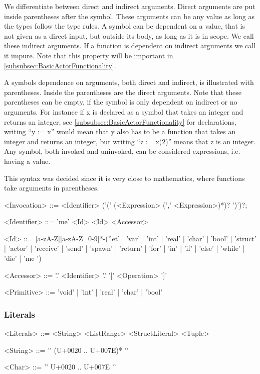 We differentiate between direct and indirect arguments. Direct arguments are put inside parentheses after the symbol. These arguments can be any value as long as the types follow the type rules. A symbol can be dependent on a value, that is not given as a direct input, but outside its body, as long as it is in scope. We call these indirect arguments. If a function is dependent on indirect arguments we call it impure. Note that this property will be important in \cref{subsubsec:BasicActorFunctionality}. 

A symbols dependence on arguments, both direct and indirect, is illustrated with parentheses. Inside the parentheses are the direct arguments. Note that these parentheses can be empty, if the symbol is only dependent on indirect or no arguments. For instance if x is declared as a symbol that takes an integer and returns an integer, see \cref{subsubsec:BasicActorFunctionality} for declarations, writing \enquote{y := x} would mean that y also has to be a function that takes an integer and returns an integer, but writing \enquote{z := x(2)} means that z is an integer. Any symbol, both invoked and uninvoked, can be considered expressions, i.e. having a value.

This syntax was decided since it is very close to mathematics, where functions take arguments in parentheses.
\begin{grammar}
<Invocation> ::= <Identifier> ('(' (<Expression> (',' <Expression>)*)? ')')?;

<Identifier> ::= 'me'
 \alt <Id>
 \alt <Id> <Accessor>

<Id> ::= [a-zA-Z][a-zA-Z\_0-9]*-('let' | 'var' | 'int' | 'real' | 'char' | 'bool' | 'struct' | 'actor' | 'receive' | 'send' | 'spawn' | 'return' | 'for' | 'in' | 'if' | 'else' | 'while' | 'die' | 'me ')

<Accessor> ::= '.' <Identifier>
 \alt '.' '[' <Operation> ']'

<Primitive> ::= 'void' | 'int' | 'real' | 'char' | 'bool'
\end{grammar}

\subsubsection{Literals}

\begin{grammar}
<Literals> ::= <String>
 \alt <ListRange>
 \alt <StructLiteral>
 \alt <Tuple>

<String> ::= '\textquotedbl' (U+0020 .. U+007E)* '\textquotedbl'

<Char> ::= '\textquotesingle' U+0020 .. U+007E '\textquotesingle'
\end{grammar}

